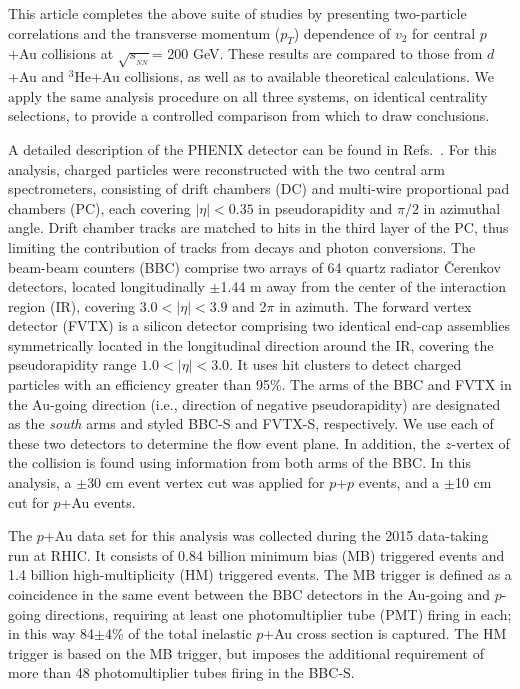 \documentclass[%
reprint,
showpacs,preprintnumbers,
 amsmath,amssymb,
 aps,
]{revtex4-1}
\newcommand{\pt}{\mbox{$p_T$}\xspace}
\newcommand{\sqsn}{\mbox{$\sqrt{s_{_{NN}}}$}\xspace}
\newcommand{\dau}{\mbox{$d$+Au}\xspace}
\newcommand{\pau}{\mbox{$p$+Au}\xspace}
\newcommand{\hau}{\mbox{$^3\text{He}$+Au}\xspace}
\newcommand{\pp}{\mbox{$p$+$p$}\xspace}
\newcommand{\bbceta}{\mbox{$3.0<|\eta|<3.9$}\xspace}
\begin{document}
This article completes the above suite of studies by presenting two-particle correlations and the transverse momentum (\pt) dependence of $v_2$ for central \pau collisions at \sqsn = 200 GeV. These results are compared to those from \dau and \hau collisions, as well as to available theoretical calculations. We apply the same analysis procedure on all three systems, on identical centrality selections, to provide a controlled comparison from which to draw conclusions.

A detailed description of the PHENIX detector can be found in Refs.~\cite{Adcox2003469,fvtx}. For this analysis, charged particles were reconstructed with the two central arm spectrometers, consisting of drift chambers (DC) and multi-wire proportional pad chambers (PC), each covering $|\eta|<0.35$ in pseudorapidity and $\pi/2$ in azimuthal angle. Drift chamber tracks are matched to hits in the third layer of the PC, thus limiting the contribution of tracks from decays and photon conversions. The beam-beam counters (BBC) comprise two arrays of 64 quartz radiator \v{C}erenkov detectors, located longitudinally $\pm$1.44 m away from the center of the interaction region (IR), covering \bbceta and 2$\pi$ in azimuth. The forward vertex detector (FVTX) is a silicon detector comprising two identical end-cap assemblies symmetrically located in the longitudinal direction around the IR, covering the pseudorapidity range $1.0 < |\eta| < 3.0$. It uses hit clusters to detect charged particles with an efficiency greater than 95\%.
The arms of the BBC and FVTX in the Au-going direction (i.e., direction of negative pseudorapidity) are designated as the \emph{south} arms and styled BBC-S and FVTX-S, respectively. We use each of these two detectors to determine the flow event plane. In addition, the $z$-vertex of the collision is found using information from both arms of the BBC. In this analysis, a $\pm$30 cm event vertex cut was applied for \pp events, and a $\pm$10 cm cut for \pau events.

The \pau data set for this analysis was collected during the 2015 data-taking run at RHIC. It consists of 0.84 billion minimum bias (MB) triggered events and 1.4 billion high-multiplicity (HM) triggered events. The MB trigger is defined as a coincidence in the same event between the BBC detectors in the Au-going and $p$-going directions, requiring at least one photomultiplier tube (PMT) firing in each; in this way 84$\pm$4\% of the total inelastic \pau cross section is captured. The HM trigger is based on the MB trigger, but imposes the additional requirement of more than 48 photomultiplier tubes firing in the BBC-S. 
\end{document}
